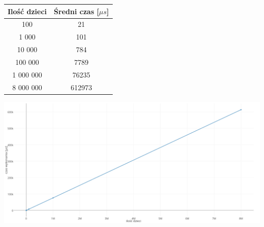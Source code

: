 \documentclass{article}
\begin{document}
	\begin{center}
		\begin{tabular}{c c}
			\toprule
				Ilość dzieci & Średni czas [$\mu s$] \\
			\midrule
				100 & 21 \\
				1 000 & 101 \\
				10 000 & 784 \\
				100 000 & 7789 \\
				1 000 000 & 76235 \\
				8 000 000 & 612973 \\
			\bottomrule
		\end{tabular}

		\vspace{3cm}
		\includegraphics[width=\textwidth]{test_plot.png}
	\end{center}
\end{document}
